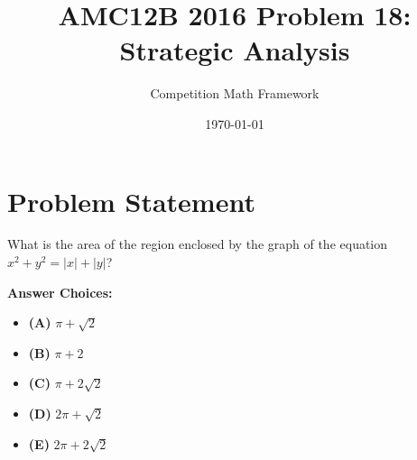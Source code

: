 \documentclass[]{article}
\begin{document}
\title{AMC12B 2016 Problem 18: Strategic Analysis}
\author{Competition Math Framework}
\date{\today}
\maketitle

\section*{Problem Statement}

What is the area of the region enclosed by the graph of the equation $x^2+y^2=|x|+|y|$?

\textbf{Answer Choices:}
\begin{itemize}
    \item \textbf{(A)} $\pi+\sqrt{2}$
    \item \textbf{(B)} $\pi+2$
    \item \textbf{(C)} $\pi+2\sqrt{2}$
    \item \textbf{(D)} $2\pi+\sqrt{2}$
    \item \textbf{(E)} $2\pi+2\sqrt{2}$
\end{itemize}
\end{document}
